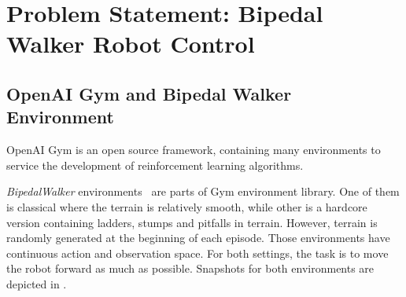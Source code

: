 \section{Problem Statement: Bipedal Walker Robot Control}
\label{sec:problem_statement}

\subsection{OpenAI Gym and Bipedal Walker Environment}
\label{ssec:gym_bipedal}

OpenAI Gym \cite{brockman_openai_2016} is an open source framework, 
containing many environments to service the development of 
reinforcement learning algorithms. 

\textit{BipedalWalker} environments~\cite{noauthor_bipedalwalker-v2_2021, noauthor_bipedalwalkerhardcore-v2_2021} are parts of Gym environment library. 
One of them is classical where the terrain is relatively smooth, while other is a hardcore version containing ladders, stumps and pitfalls in terrain. 
However, terrain is randomly generated at the beginning of each episode.
Those environments have continuous action and observation space. 
For both settings, the task is to move the robot forward as much as possible. 
Snapshots for both environments are depicted in .
